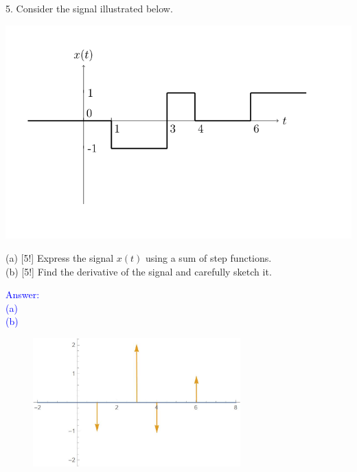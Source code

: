 \documentclass[12pt,a4paper]{article}
\begin{document}
\newpage
\begin{tcolorbox}[colback = white]
5. Consider the signal illustrated below.
\begin{center}
\includegraphics[scale=0.5]{problem5.png}
\end{center}
(a) [5!] Express the signal $x(t)$ using a sum of step functions.\\
(b) [5!] Find the derivative of the signal and carefully sketch it.
\end{tcolorbox}

\begin{tcolorbox}
\normalsize
\textcolor{blue}{Answer:\\
(a) \\
(b) \\
\begin{figure}[H]
    \centering
    \includegraphics[width=8cm]{5b.jpg}
\end{figure}
}
\end{tcolorbox}
\end{document}

